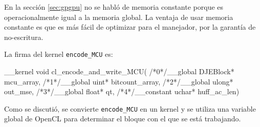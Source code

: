En la sección \ref{sec:gpgpu} no se habló de memoria constante porque es
operacionalmente igual a la memoria global. La ventaja de usar memoria
constante es que es más fácil de optimizar para el manejador, por la garantía
de no-escritura.

La firma del kernel \verb+encode_MCU+ es:

\begin{code}[language=C][h]
__kernel void
cl_encode_and_write_MCU(
    /*0*/__global DJEBlock* mcu_array,
    /*1*/__global uint* bitcount_array,
    /*2*/__global ulong* out_mse,
    /*3*/__global float* qt,
    /*4*/__constant uchar* huff_ac_len)
\end{code}

Como se discutió, se convierte \verb+encode_MCU+ en un kernel y se utiliza una
variable global de OpenCL para determinar el bloque con el que se está
trabajando.

